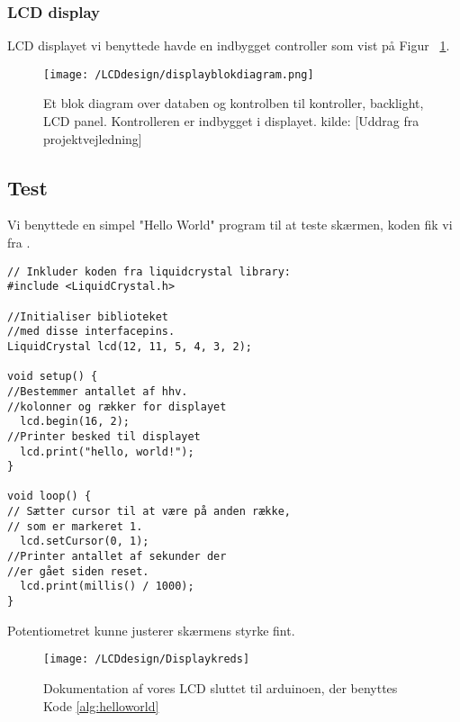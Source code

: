 \subsubsection{LCD display}
LCD displayet vi benyttede havde en indbygget controller som vist på Figur ~\ref{driver}.
\begin{figure}[H]
	\centering
    \texttt{[image: /LCDdesign/displayblokdiagram.png]}
	\caption{Et blok diagram over databen og kontrolben til  kontroller, backlight, LCD panel. Kontrolleren er indbygget i displayet. kilde: [Uddrag fra projektvejledning]}
	\label{driver}
\end{figure}


 
\subsection{Test}
Vi benyttede en simpel "Hello World" program til at teste skærmen, koden fik vi fra \cite{arduinoLCD}.





\begin{lstlisting}[caption=kodeeksempel "Hello World" med timer, label={alg:helloworld}]
// Inkluder koden fra liquidcrystal library:
#include <LiquidCrystal.h>

//Initialiser biblioteket 
//med disse interfacepins.
LiquidCrystal lcd(12, 11, 5, 4, 3, 2);

void setup() {
//Bestemmer antallet af hhv.
//kolonner og rækker for displayet
  lcd.begin(16, 2);
//Printer besked til displayet
  lcd.print("hello, world!");
}

void loop() {
// Sætter cursor til at være på anden række,
// som er markeret 1.
  lcd.setCursor(0, 1);
//Printer antallet af sekunder der 
//er gået siden reset.
  lcd.print(millis() / 1000);
}
\end{lstlisting}


Potentiometret kunne justerer skærmens styrke fint.
\begin{figure}[H]
	\centering
    \texttt{[image: /LCDdesign/Displaykreds]}
	\caption{Dokumentation af vores LCD sluttet til arduinoen, der benyttes Kode \ref{alg:helloworld}}
	\label{fig: dispalykreds}
\end{figure}
